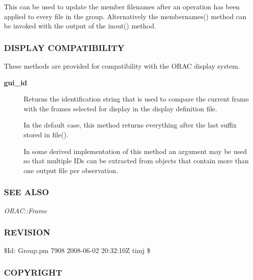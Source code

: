 \begin{description}
\begin{description}
This can be used to update the member filenames after an operation
has been applied to every file in the group. Alternatively the 
membernames() method can be invoked with the output of the inout()
method.

\end{description}
\subsubsection*{DISPLAY COMPATIBILITY\label{ORAC::Group_DISPLAY_COMPATIBILITY}}


These methods are provided for compatibility with the ORAC display
system.

\begin{description}

\item[{\textbf{gui\_id}}] \mbox{}

Returns the identification string that is used to compare the
current frame with the frames selected for display in the
display definition file.



In the default case, this method returns everything after the
last suffix stored in file().



In some derived implementation of this method an argument
may be used so that multiple IDs can be extracted from objects
that contain more than one output file per observation.

\end{description}
\subsubsection*{SEE ALSO\label{ORAC::Group_SEE_ALSO}}


\emph{ORAC::Frame}

\subsubsection*{REVISION\label{ORAC::Group_REVISION}}


\$Id: Group.pm 7908 2008-06-02 20:32:10Z timj \$

\subsubsection*{COPYRIGHT\label{ORAC::Group_COPYRIGHT}}



\end{description}
